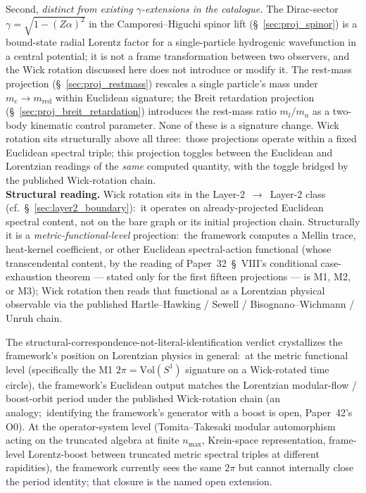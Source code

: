 \documentclass[11pt]{article}
\begin{document}
Second, \emph{distinct from existing $\gamma$-extensions in the
catalogue.}  The Dirac-sector $\gamma = \sqrt{1 - (Z\alpha)^2}$ in
the Camporesi--Higuchi spinor lift (\S~\ref{sec:proj_spinor}) is a
bound-state radial Lorentz factor for a single-particle hydrogenic
wavefunction in a central potential; it is not a frame
transformation between two observers, and the Wick rotation
discussed here does not introduce or modify it.  The rest-mass
projection (\S~\ref{sec:proj_restmass}) rescales a single particle's
mass under $m_e \to m_\text{red}$ within Euclidean signature; the
Breit retardation projection
(\S~\ref{sec:proj_breit_retardation}) introduces the rest-mass
ratio $m_l/m_n$ as a two-body kinematic control parameter.  None of
these is a signature change.  Wick rotation sits structurally above
all three:\ those projections operate within a fixed Euclidean
spectral triple; this projection toggles between the Euclidean and
Lorentzian readings of the \emph{same} computed quantity, with the
toggle bridged by the published Wick-rotation chain.\\
\textbf{Structural reading.}  Wick rotation sits in the
Layer-2~$\to$~Layer-2 class (cf.\
\S~\ref{sec:layer2_boundary}):\ it operates on already-projected
Euclidean spectral content, not on the bare graph or its initial
projection chain.  Structurally it is a
\emph{metric-functional-level} projection:\ the framework computes a
Mellin trace, heat-kernel coefficient, or other Euclidean
spectral-action functional (whose transcendental content, by the
reading of Paper~32~\S~VIII's conditional case-exhaustion theorem ---
stated only for the first fifteen projections --- is M1, M2, or M3); Wick rotation
then reads that functional as a Lorentzian physical observable via
the published Hartle--Hawking / Sewell / Bisognano--Wichmann / Unruh
chain.

The structural-correspondence-not-literal-identification verdict
crystallizes the framework's position on Lorentzian physics in
general:\ at the metric functional level (specifically the M1
$2\pi = \mathrm{Vol}(S^1)$ signature on a Wick-rotated time circle),
the framework's Euclidean output matches the Lorentzian modular-flow /
boost-orbit period under the published Wick-rotation chain (an analogy;\
identifying the framework's generator with a boost is open, Paper~42's O0).  At the
operator-system level (Tomita--Takesaki modular automorphism acting
on the truncated algebra at finite $n_{\max}$, Krein-space
representation, frame-level Lorentz-boost between truncated metric
spectral triples at different rapidities), the framework currently
sees the same $2\pi$ but cannot internally close the period
identity; that closure is the named open extension.
\end{document}
